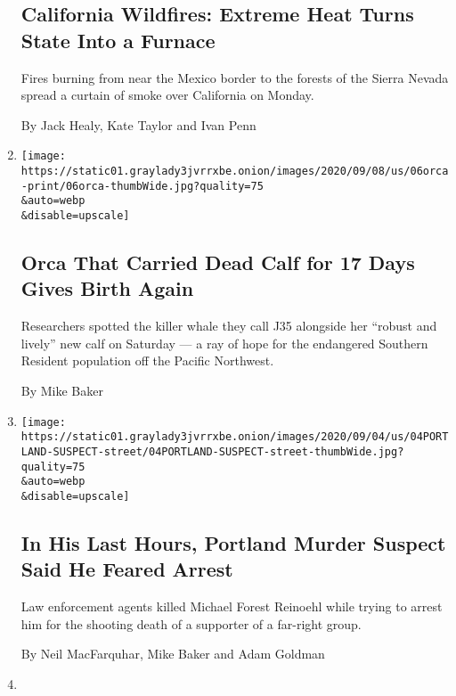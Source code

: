 \begin{enumerate}
{  \subsection{California Wildfires: Extreme Heat Turns State Into a
  Furnace}\label{california-wildfires-extreme-heat-turns-state-into-a-furnace}}

  Fires burning from near the Mexico border to the forests of the Sierra
  Nevada spread a curtain of smoke over California on Monday.

  By Jack Healy, Kate Taylor and Ivan Penn
\item
  \href{/2020/09/06/us/orca-calf-j35-j57-whale.html}{}

  \texttt{[image: https://static01.graylady3jvrrxbe.onion/images/2020/09/08/us/06orca-print/06orca-thumbWide.jpg?quality=75\\\&auto=webp\\\&disable=upscale]}

  \hypertarget{orca-that-carried-dead-calf-for-17-days-gives-birth-again}{%
  \subsection{Orca That Carried Dead Calf for 17 Days Gives Birth
  Again}\label{orca-that-carried-dead-calf-for-17-days-gives-birth-again}}

  Researchers spotted the killer whale they call J35 alongside her
  ``robust and lively'' new calf on Saturday --- a ray of hope for the
  endangered Southern Resident population off the Pacific Northwest.

  By Mike Baker
\item
  \href{/2020/09/04/us/portland-shooting-michael-reinoehl.html}{}

  \texttt{[image: https://static01.graylady3jvrrxbe.onion/images/2020/09/04/us/04PORTLAND-SUSPECT-street/04PORTLAND-SUSPECT-street-thumbWide.jpg?quality=75\\\&auto=webp\\\&disable=upscale]}

  \hypertarget{in-his-last-hours-portland-murder-suspect-said-he-feared-arrest}{%
  \subsection{In His Last Hours, Portland Murder Suspect Said He Feared
  Arrest}\label{in-his-last-hours-portland-murder-suspect-said-he-feared-arrest}}

  Law enforcement agents killed Michael Forest Reinoehl while trying to
  arrest him for the shooting death of a supporter of a far-right group.

  By Neil MacFarquhar, Mike Baker and Adam Goldman
\item
  \href{/2020/09/04/us/michael-forest-reinoehl-portland.html}{}


\end{enumerate}
